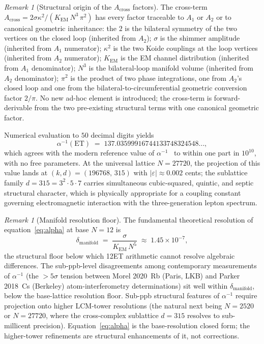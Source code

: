 \documentclass[11pt,a4paper]{article}
\theoremstyle{definition}
\theoremstyle{remark}
\newtheorem{remark}[theorem]{Remark}
\newcommand{\eps}{\varepsilon}
\begin{document}
\begin{remark}[Structural origin of the $A_{\mathrm{cross}}$ factors]\label{rem:Across-factors}
The cross-term $A_{\mathrm{cross}} = 2\sigma\kappa^{2}/(K_{\mathrm{EM}}\,N^{3}\,\pi^{2})$ has every factor traceable to $A_{1}$ or $A_{2}$ or to canonical geometric inheritance: the $2$ is the bilateral symmetry of the two vertices on the closed loop (inherited from $A_{2}$); $\sigma$ is the shimmer amplitude (inherited from $A_{1}$ numerator); $\kappa^{2}$ is the two Koide couplings at the loop vertices (inherited from $A_{2}$ numerator); $K_{\mathrm{EM}}$ is the EM channel distribution (inherited from $A_{1}$ denominator); $N^{3}$ is the bilateral-loop manifold volume (inherited from $A_{2}$ denominator); $\pi^{2}$ is the product of two phase integrations, one from $A_{2}$'s closed loop and one from the bilateral-to-circumferential geometric conversion factor $2/\pi$. No new ad-hoc element is introduced; the cross-term is forward-derivable from the two pre-existing structural terms with one canonical geometric factor.
\end{remark}

Numerical evaluation to $50$ decimal digits yields
\[
\alpha^{-1}(\mathrm{ET}) \;=\; 137.03599916744133748324548\ldots,
\]
which agrees with the modern reference value of $\alpha^{-1}$~\cite{LatComp2025} to within one part in $10^{10}$, with no free parameters. At the universal lattice $N=27720$, the projection of this value lands at $(k,d)=(196768,\,315)$ with $|\eps|\approx 0.002$ cents; the sublattice family $d=315 = 3^{2}\cdot 5\cdot 7$ carries simultaneous cubic-squared, quintic, and septic structural character, which is physically appropriate for a coupling constant governing electromagnetic interaction with the three-generation lepton spectrum.

\begin{remark}[Manifold resolution floor]\label{rem:alpha-resolution-floor}
The fundamental theoretical resolution of equation~\eqref{eq:alpha} at base $N=12$ is
\[
\delta_{\mathrm{manifold}} \;=\; \frac{\sigma}{K_{\mathrm{EM}}\,N^{5}} \;\approx\; 1.45\times 10^{-7},
\]
the structural floor below which 12ET arithmetic cannot resolve algebraic differences. The sub-ppb-level disagreements among contemporary measurements of $\alpha^{-1}$ (the $>5\sigma$ tension between Morel 2020~Rb (Paris, LKB) and Parker 2018~Cs (Berkeley) atom-interferometry determinations) sit well within $\delta_{\mathrm{manifold}}$, below the base-lattice resolution floor. Sub-ppb structural features of $\alpha^{-1}$ require projection onto higher LCM-tower resolutions (the natural next being $N=2520$ or $N=27720$, where the cross-complex sublattice $d=315$ resolves to sub-millicent precision). Equation~\eqref{eq:alpha} is the base-resolution closed form; the higher-tower refinements are structural enhancements of it, not corrections.
\end{remark}
\end{document}

